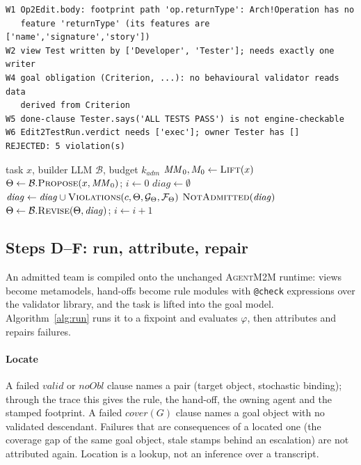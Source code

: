 \documentclass[10pt,conference]{IEEEtran}
\theoremstyle{definition}
\newcommand{\tool}{\textsc{AgentM2M}}
\newcommand{\MM}{\mathit{MM}}
\newcommand{\Team}{\Theta}
\newcommand{\W}[1]{\textsf{W#1}}
\newcommand{\code}[1]{\texttt{#1}}
\begin{document}
\begin{lstlisting}[caption={Checker output on the seeded proposal.}, label={lst:diag}]
W1 Op2Edit.body: footprint path 'op.returnType': Arch!Operation has no
   feature 'returnType' (its features are ['name','signature','story'])
W2 view Test written by ['Developer', 'Tester']; needs exactly one writer
W4 goal obligation (Criterion, ...): no behavioural validator reads data
   derived from Criterion
W5 done-clause Tester.says('ALL TESTS PASS') is not engine-checkable
W6 Edit2TestRun.verdict needs ['exec']; owner Tester has []
REJECTED: 5 violation(s)
\end{lstlisting}

\begin{algorithm}[t]
\caption{Admission (Steps A--C)}\label{alg:admit}
\small
\begin{algorithmic}[1]
\Require task $x$, builder LLM $\mathcal{B}$, budget $k_{\mathit{adm}}$
\State $\MM_0, M_0 \gets \Call{Lift}{x}$ 
\State $\Team \gets \mathcal{B}.\Call{Propose}{x, \MM_0}$; $i\gets 0$
\Loop
  \State $\mathit{diag}\gets\emptyset$
  \For{$c \in \langle\W1,\dots,\W6\rangle$}
     \State $\mathit{diag}\gets\mathit{diag}\cup\Call{Violations}{c,\Team,\mathcal{G}_\Team,\mathcal{F}_\Team}$
  \EndFor
   \Return \Call{Compile}{$\Team$, $M_0$} 
  \EndIf
   \Return $\textsc{NotAdmitted}(\mathit{diag})$ \EndIf
  \State $\Team \gets \mathcal{B}.\Call{Revise}{\Team,\mathit{diag}}$; $i\gets i+1$
\EndLoop
\end{algorithmic}
\end{algorithm}

\subsection{Steps D--F: run, attribute, repair}\label{sec:runloop}

An admitted team is compiled onto the unchanged \tool{} runtime: views become
metamodels, hand-offs become rule modules with \code{@check} expressions over
the validator library, and the task is lifted into the goal model.
Algorithm~\ref{alg:run} runs it to a fixpoint and evaluates $\varphi$, then
attributes and repairs failures.

\paragraph*{Locate} A failed $\mathit{valid}$ or $\mathit{noObl}$ clause names
a pair (target object, stochastic binding); through the trace this gives the
rule, the hand-off, the owning agent and the stamped footprint. A failed
$\mathit{cover}(G)$ clause names a goal object with no validated descendant.
Failures that are consequences of a located one (the coverage gap of the same
goal object, stale stamps behind an escalation) are not attributed again.
Location is a lookup, not an inference over a transcript.
\end{document}
